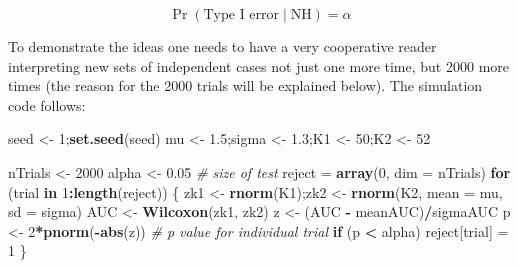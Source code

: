 \documentclass[
]{book}
\newenvironment{Shaded}{\begin{snugshade}}{\end{snugshade}}
\newcommand{\CommentTok}[1]{\textcolor[rgb]{0.56,0.35,0.01}{\textit{#1}}}
\newcommand{\ControlFlowTok}[1]{\textcolor[rgb]{0.13,0.29,0.53}{\textbf{#1}}}
\newcommand{\DataTypeTok}[1]{\textcolor[rgb]{0.13,0.29,0.53}{#1}}
\newcommand{\DecValTok}[1]{\textcolor[rgb]{0.00,0.00,0.81}{#1}}
\newcommand{\FloatTok}[1]{\textcolor[rgb]{0.00,0.00,0.81}{#1}}
\newcommand{\KeywordTok}[1]{\textcolor[rgb]{0.13,0.29,0.53}{\textbf{#1}}}
\newcommand{\NormalTok}[1]{#1}
\newcommand{\OperatorTok}[1]{\textcolor[rgb]{0.81,0.36,0.00}{\textbf{#1}}}
\newcommand{\StringTok}[1]{\textcolor[rgb]{0.31,0.60,0.02}{#1}}
\begin{document}
\begin{equation*} 
\Pr( \text{Type I error} \mid \text{NH} )=\alpha
\end{equation*}

To demonstrate the ideas one needs to have a very cooperative reader interpreting new sets of independent cases not just one more time, but 2000 more times (the reason for the 2000 trials will be explained below). The simulation code follows:

\begin{Shaded}
\begin{Highlighting}[]
\NormalTok{seed <-}\StringTok{ }\DecValTok{1}\NormalTok{;}\KeywordTok{set.seed}\NormalTok{(seed)}
\NormalTok{mu <-}\StringTok{ }\FloatTok{1.5}\NormalTok{;sigma <-}\StringTok{ }\FloatTok{1.3}\NormalTok{;K1 <-}\StringTok{ }\DecValTok{50}\NormalTok{;K2 <-}\StringTok{ }\DecValTok{52}

\NormalTok{nTrials <-}\StringTok{ }\DecValTok{2000}
\NormalTok{alpha <-}\StringTok{ }\FloatTok{0.05} \CommentTok{# size of test}
\NormalTok{reject =}\StringTok{ }\KeywordTok{array}\NormalTok{(}\DecValTok{0}\NormalTok{, }\DataTypeTok{dim =}\NormalTok{ nTrials)}
\ControlFlowTok{for}\NormalTok{ (trial }\ControlFlowTok{in} \DecValTok{1}\OperatorTok{:}\KeywordTok{length}\NormalTok{(reject)) \{  }
\NormalTok{  zk1 <-}\StringTok{ }\KeywordTok{rnorm}\NormalTok{(K1);zk2 <-}\StringTok{ }\KeywordTok{rnorm}\NormalTok{(K2, }\DataTypeTok{mean =}\NormalTok{ mu, }\DataTypeTok{sd =}\NormalTok{ sigma)  }
\NormalTok{  AUC <-}\StringTok{ }\KeywordTok{Wilcoxon}\NormalTok{(zk1, zk2)  }
\NormalTok{  z <-}\StringTok{ }\NormalTok{(AUC }\OperatorTok{-}\StringTok{ }\NormalTok{meanAUC)}\OperatorTok{/}\NormalTok{sigmaAUC}
\NormalTok{  p <-}\StringTok{ }\DecValTok{2}\OperatorTok{*}\KeywordTok{pnorm}\NormalTok{(}\OperatorTok{-}\KeywordTok{abs}\NormalTok{(z)) }\CommentTok{# p value for individual trial}
  \ControlFlowTok{if}\NormalTok{ (p }\OperatorTok{<}\StringTok{ }\NormalTok{alpha) reject[trial] =}\StringTok{ }\DecValTok{1} 
\NormalTok{\}}


\end{Highlighting}
\end{Shaded}
\end{document}

